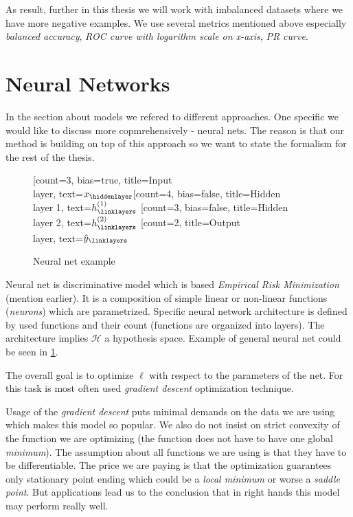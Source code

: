 As result, further in this thesis we will work with imbalanced datasets where we have more negative examples. We use several metrics mentioned above especially \emph{balanced accuracy}, \emph{ROC curve with logarithm scale on x-axis}, \emph{PR curve}.

\section{Neural Networks}
In the section about models we refered to different approaches. One specific we would like to discuss more copmrehensively - neural nets. The reason is that our method is building on top of this approach so we want to state the formalism for the rest of the thesis.
\begin{figure}
    \centering
    \begin{neuralnetwork}[height=4]
        \newcommand{\x}[2]{$x_#2$}
        \newcommand{\y}[2]{$\hat{y}_#2$}
        \newcommand{\hfirst}[2]{\small $h^{(1)}_#2$}
        \newcommand{\hsecond}[2]{\small $h^{(2)}_#2$}
        [count=3, bias=true, title=Input\\layer, text=\x]
        \hiddenlayer[count=4, bias=false, title=Hidden\\layer 1, text=\hfirst] \linklayers
        \hiddenlayer[count=3, bias=false, title=Hidden\\layer 2, text=\hsecond] \linklayers
        \outputlayer[count=2, title=Output\\layer, text=\y] \linklayers
    \end{neuralnetwork}
    \caption{Neural net example}
    \label{fig:neuralnet}
\end{figure}

Neural net is discriminative model which is based \emph{Empirical Risk Minimization} (mention earlier). It is a composition of simple linear or non-linear functions (\emph{neurons}) which are parametrized. Specific neural network architecture is defined by used functions and their count (functions are organized into layers). The architecture implies $\mathcal{H}$ a hypothesis space. Example of general neural net could be seen in \ref{fig:neuralnet}. 

The overall goal is to optimize $\ell$ with respect to the parameters of the net. For this task is most often used \emph{gradient descent} optimization technique.

Usage of the \emph{gradient descent} puts minimal demands on the data we are using which makes this model so popular. We also do not insist on strict convexity of the function we are optimizing (the function does not have to have one global \emph{minimum}). The assumption about all functions we are using is that they have to be differentiable. The price we are paying is that the optimization guarantees only stationary point ending which could be a \emph{local minimum} or worse a \emph{saddle point}. But applications lead us to the conclusion that in right hands this model may perform really well.

